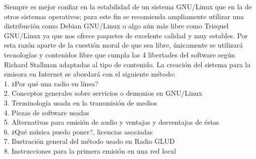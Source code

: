 \begin{multicols}{2}



\vspace{2mm}

Siempre es mejor confiar en la estabilidad de un sistema GNU/Linux que en la de otros sistemas operativos; para este fin se recomienda ampliamente utilizar una distribución como Debian GNU/Linux o algo aún más libre como Trisquel GNU/Linux ya que nos ofrece paquetes de excelente calidad y muy estables. Por esta razón aparte de la cuestión moral de que sea libre, únicamente se utilizará tecnologías y contenidos libre que cumpla las 4 libertades del software según Richard Stallman adaptadas al tipo de contenido. La creación del sistema para la emisora en Internet se abordará con el siguiente método:\\

 1. żPor qué una radio en línea?\\
 2. Conceptos generales sobre servicios o demonios en GNU/Linux\\
 3. Terminología usada en la transmisión de medios\\
 4. Piezas de software usadas\\
 5. Alternativas para emisión de audio y ventajas y desventajas de éstas\\
 6. żQué música puedo poner?, licencias asociadas\\
 7. Ilustración general del método usado en Radio GLUD\\
 8. Instrucciones para la primera emisión en una red local\\


\end{multicols}

